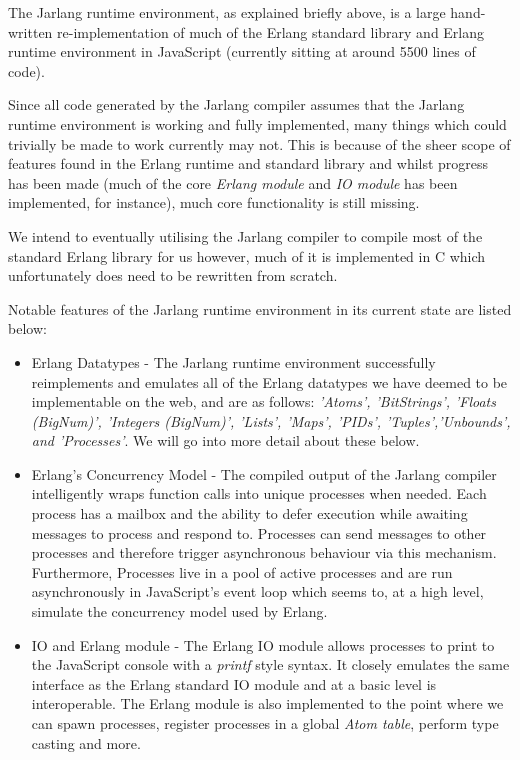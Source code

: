 \documentclass[twoside,12pt,titlepage,a4paper]{article}
\begin{document}
The Jarlang runtime environment, as explained briefly above, is a large hand-written re-implementation of much of the Erlang standard library and Erlang runtime environment in JavaScript (currently sitting at around 5500 lines of code). 

Since all code generated by the Jarlang compiler assumes that the Jarlang runtime environment is working and fully implemented, many things which could trivially be made to work currently may not. This is because of the sheer scope of features found in the Erlang runtime and standard library and whilst progress has been made (much of the core \textit{Erlang module} and \textit{IO module} has been implemented, for instance), much core functionality is still missing.

We intend to eventually utilising the Jarlang compiler to compile most of the standard Erlang library for us however, much of it is implemented in C which unfortunately does need to be rewritten from scratch. 

Notable features of the Jarlang runtime environment in its current state are listed below:

\begin{itemize}
	\item Erlang Datatypes - The Jarlang runtime environment successfully reimplements and emulates all of the Erlang datatypes we have deemed to be implementable on the web, and are as follows: \textit{'Atoms', 'BitStrings', 'Floats (BigNum)', 'Integers (BigNum)', 'Lists', 'Maps', 'PIDs', 'Tuples','Unbounds', and 'Processes'}. We will go into more detail about these below.
	\item Erlang's Concurrency Model - The compiled output of the Jarlang compiler intelligently wraps function calls into unique processes when needed. Each process has a mailbox and the ability to defer execution while awaiting messages to process and respond to. Processes can send messages to other processes and therefore trigger asynchronous behaviour via this mechanism. Furthermore, Processes live in a pool of active processes and are run asynchronously in JavaScript's event loop which seems to, at a high level, simulate the concurrency model used by Erlang.
	\item IO and Erlang module - The Erlang IO module allows processes to print to the JavaScript console with a \textit{printf} style syntax. It closely emulates the same interface as the Erlang standard IO module and at a basic level is interoperable. The Erlang module is also implemented to the point where we can spawn processes, register processes in a global \textit{Atom table}, perform type casting and more.
\end{itemize}
\end{document}
